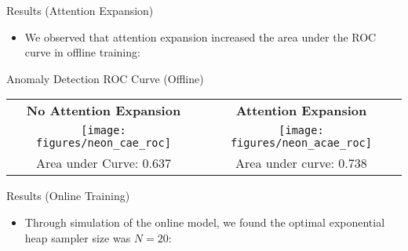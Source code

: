 \documentclass[10pt]{beamer}
\begin{document}
\begin{frame}{Results (Attention Expansion)}
\begin{itemize}
\item We observed that attention expansion increased the area under the ROC curve in offline training:\\[0.5cm]
\end{itemize}

\begin{exampleblock}{Anomaly Detection ROC Curve (Offline)}
~\\[2mm]
\begin{tabular}{c | c}
\textbf{No Attention Expansion} & \textbf{Attention Expansion}\\
\texttt{[image: figures/neon\_cae\_roc]} & \texttt{[image: figures/neon\_acae\_roc]} \\
Area under Curve:  0.637 & Area under curve: 0.738 \\ 
\end{tabular}
\end{exampleblock}
\end{frame}

\begin{frame}{Results (Online Training)}

\begin{itemize}
\item Through simulation of the online model, we found the optimal exponential heap sampler size was $N = 20$:\\[0.5cm]
\end{itemize}

\end{frame}
\end{document}
